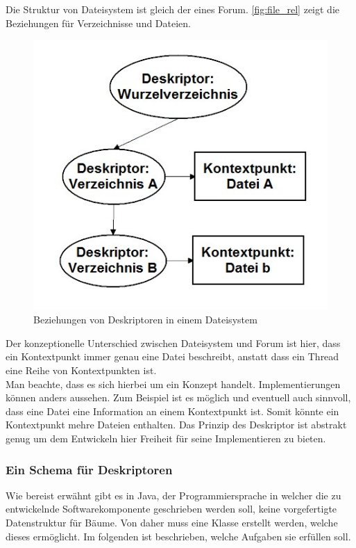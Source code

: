 \documentclass[a4paper]{article}
\begin{document}
	Die Struktur von Dateisystem ist gleich der eines Forum. \autoref{fig:file_rel}
	zeigt die Beziehungen für Verzeichnisse und Dateien.
	
	\begin{figure}[H]
		\includegraphics[width=\linewidth]{../Bilder/file_rel.jpg}
		\caption{Beziehungen von Deskriptoren in einem Dateisystem}
		\label{fig:file_rel}
	\end{figure}	
	
	Der konzeptionelle Unterschied zwischen Dateisystem und Forum ist hier, 
	dass ein Kontextpunkt immer genau eine Datei beschreibt, anstatt dass ein
	Thread eine Reihe von Kontextpunkten ist.\\
	
	Man beachte, dass es sich hierbei um ein Konzept handelt.
	Implementierungen können anders aussehen. Zum Beispiel ist es möglich und
	eventuell auch sinnvoll, dass eine Datei eine Information an einem Kontextpunkt
	ist. Somit könnte ein Kontextpunkt mehre Dateien enthalten. Das Prinzip des
	Deskriptor ist abstrakt genug um dem Entwickeln hier Freiheit für seine
	Implementieren zu bieten.
	
	\subsubsection{Ein Schema für Deskriptoren}
	
	Wie bereist erwähnt gibt es in Java, der Programmiersprache in welcher die 
	zu entwickelnde Softwarekomponente geschrieben werden soll, keine vorgefertigte
	Datenstruktur für Bäume. Von daher muss eine Klasse erstellt werden, welche
	dieses ermöglicht. Im folgenden ist beschrieben, welche Aufgaben sie erfüllen
	soll.
	
\end{document}
